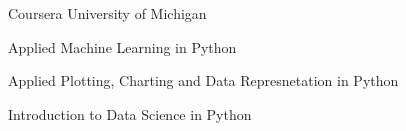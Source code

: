 

\begin{cventries}

  \cventry
    {Coursera}
    {University of Michigan}
    {}
    {}
    {
      \begin{cvitems} %
        \item {Applied Machine Learning in Python}
	\item {Applied Plotting, Charting and Data Represnetation in Python}	
	\item {Introduction to Data Science in Python}	
      \end{cvitems}
    }

\end{cventries}
